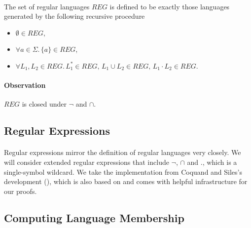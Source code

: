 \documentclass[11pt,a4paper,oneside]{book}
\begin{document}
            \paragraph{}
            The set of regular languages $REG$ is defined to be exactly those languages generated by the following recursive procedure
            \begin{itemize}
                \item
                    $\emptyset \in REG$, 
                \item
                    $\forall a \in \Sigma. \, \{a\} \in REG$, 
                \item
                    $\forall L_1, L_2 \in REG. \, L_1^* \in REG, \, L_1 \cup L_2 \in REG, \, L_1 \cdot L_2 \in REG$.
            \end{itemize}

            \paragraph{Observation} $REG$ is closed under $\neg$ and $\cap$.


        \subsection{Regular Expressions}

                \paragraph{} 
                Regular expressions mirror the definition of regular languages very closely. We will consider extended regular expressions that include $\neg$, $\cap$ and $.$, which is a single-symbol wildcard. 
                We take the implementation from Coquand and Siles's development (\cite{DBLP:conf/cpp/CoquandS11}), which is also based on \ssreflect and comes with helpful infrastructure for our proofs.


                \subsection{Computing Language Membership}
\end{document}
